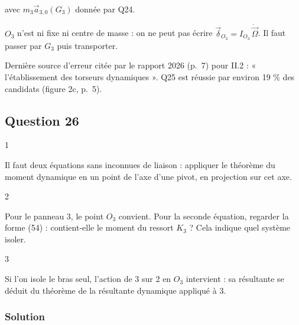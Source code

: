 \documentclass[11pt,a4paper]{article}
\begin{document}
avec \(m_3\vec a_{3,0}(G_3)\) donnée par Q24.

\begin{piege}

\(O_3\) n'est ni fixe ni centre de masse : on ne peut pas écrire \(\vec\delta_{O_3}=I_{O_3}\,\dot{\vec\Omega}\). Il faut passer par \(G_3\) puis transporter.

\end{piege}

\begin{jury}

Dernière source d'erreur citée par le rapport 2026 (p.~7) pour II.2 : « l'établissement des torseurs dynamiques ». Q25 est réussie par environ 19 \% des candidats (figure 2c, p.~5).

\end{jury}

\hypertarget{question-26}{%
\subsection{Question 26}\label{question-26}}

\begin{indication}{1}

Il faut deux équations sans inconnues de liaison : appliquer le théorème du moment dynamique en un point de l'axe d'une pivot, en projection sur cet axe.

\end{indication}

\begin{indication}{2}

Pour le panneau 3, le point \(O_3\) convient. Pour la seconde équation, regarder la forme (54) : contient-elle le moment du ressort \(K_3\) ? Cela indique quel système isoler.

\end{indication}

\begin{indication}{3}

Si l'on isole le bras seul, l'action de 3 sur 2 en \(O_3\) intervient : sa résultante se déduit du théorème de la résultante dynamique appliqué à 3.

\end{indication}

\hypertarget{solution-25}{%
\subsubsection{Solution}\label{solution-25}}
\end{document}
